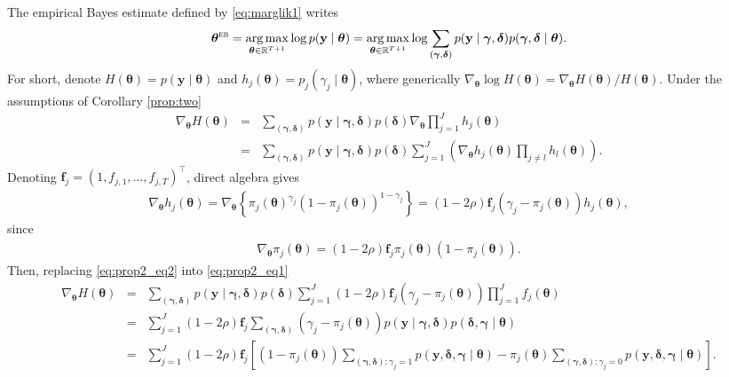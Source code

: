 \documentclass[12pt]{article}
\newcommand{\mb}[1]{\mathbf{#1}}
\newcommand{\tr}[1]{#1^{\intercal}}
\DeclareMathOperator*{\argmax}{arg\,max}
\newcommand{\by}{{\mb{y}}}
\newcommand{\bgamma}{{\bm{\gamma}}}
\newcommand{\bdelta}{{\bm{\delta}}}
\newcommand{\btheta}{{\bm{\theta}}}
\newcommand{\bthetaeb}{\btheta^{\textsc{eb}}}
\begin{document}
The empirical Bayes estimate defined by \eqref{eq:marglik1} writes
\begin{align*}
\bthetaeb = \argmax_{\btheta \in \mathbb{R}^{T+1}} \log p(\by \mid \btheta) = \argmax_{\btheta \in \mathbb{R}^{T+1}} \log \sum_{(\bgamma, \bdelta)} p(\by \mid \bgamma, \bdelta) p(\bgamma, \bdelta \mid \btheta).
\end{align*}
For short, denote $H(\btheta) = p(\by \mid \btheta)$ and $h_{j}(\btheta) = p_{j}(\gamma_j \mid \btheta)$, where generically $\nabla_{\btheta} \log H(\btheta) = \nabla_{\btheta} H(\btheta) / H(\btheta)$. Under the assumptions of Corollary \ref{prop:two}
\begin{eqnarray}
\nabla_{\btheta} H(\btheta) &=& \sum_{(\bgamma, \bdelta)} p(\by \mid \bgamma, \bdelta) p(\bdelta) \nabla_{\btheta} \prod_{j=1}^{J} h_{j}(\btheta) \nonumber \\
&=& \sum_{(\bgamma, \bdelta)} p(\by \mid \bgamma, \bdelta) p(\bdelta) \sum_{j=1}^{J} \left( \nabla_{\btheta} h_{j}(\btheta) \prod_{j \neq l} h_{l}(\btheta) \right).  \label{eq:prop2_eq1}
\end{eqnarray}
Denoting $\mb{f}_{j} = \tr{(1, f_{j,1}, \dots, f_{j,T})} $, direct algebra gives
\begin{align}
\nabla_{\btheta} h_{j}(\btheta) = \nabla_{\btheta}\left\{ \pi_{j}(\btheta)^{\gamma_j} (1-\pi_{j}(\btheta))^{1-\gamma_j} \right\} = (1-2\rho) \mb{f}_{j} (\gamma_j - \pi_{j}(\btheta)) h_{j}(\btheta), \label{eq:prop2_eq2}
\end{align}
since
\begin{align}
\nabla_{\btheta} \pi_{j}(\btheta) = (1-2\rho) \mb{f}_{j}  \pi_{j}(\btheta) (1-\pi_{j}(\btheta)). \label{eq:prop2_eq3}
\end{align}
Then, replacing \eqref{eq:prop2_eq2} into \eqref{eq:prop2_eq1}
\begin{eqnarray}
\nabla_{\btheta} H(\btheta) &=& \sum_{(\bgamma, \bdelta)} p(\by \mid \bgamma, \bdelta) p(\bdelta) \sum_{j=1}^{J} (1-2\rho) \mb{f}_{j} (\gamma_j - \pi_{j}(\btheta)) \prod_{j=1}^{J} f_{j}(\btheta) \nonumber \\
&=& \sum_{j=1}^{J} (1-2\rho) \mb{f}_{j} \sum_{(\bgamma, \bdelta)} (\gamma_j - \pi_{j}(\btheta)) p(\by \mid \bgamma, \bdelta) p(\bdelta, \bgamma \mid \btheta) \nonumber \\
&=& \sum_{j=1}^{J} (1-2\rho) \mb{f}_{j} \left[ (1-\pi_{j}(\btheta)) \sum_{(\bgamma, \bdelta): \gamma_{j}=1} p(\by, \bdelta, \bgamma \mid \btheta) - \pi_{j}(\btheta) \sum_{(\bgamma, \bdelta): \gamma_{j}=0} p(\by, \bdelta, \bgamma \mid \btheta) \right]. \nonumber
\end{eqnarray}
\end{document}
